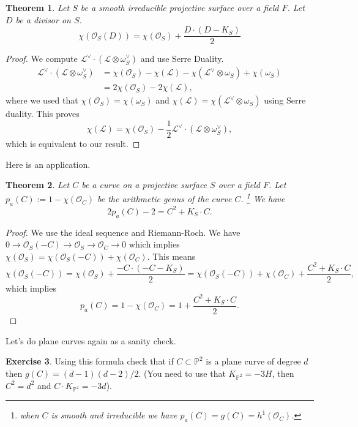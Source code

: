 \documentclass[12pt]{article}
\numberwithin{equation}{section}
\newtheorem{theorem}{Theorem}[subsection]
\theoremstyle{definition}
\newtheorem{exercise}[theorem]{Exercise}
\theoremstyle{remark}
\newcommand{\Ocal}{\mathcal{O}}
\newcommand{\PP}{\mathbb{P}}
\newcommand{\Lcal}{\mathcal{L}}
\begin{document}
\begin{theorem}
	Let $S$ be a smooth irreducible projective surface over a field $F$. 
	Let $D$ be a divisor on $S$. 
	\begin{equation}
	\chi(\Ocal_S(D)) = \chi(\Ocal_S) + \frac{D\cdot (D-K_S)}{2}
	\end{equation}
\end{theorem}
\begin{proof}
	We compute $\Lcal^{\vee} \cdot (\Lcal \otimes \omega_S^\vee)$ and use Serre Duality. 
	\begin{align*}
	\Lcal^{\vee}\cdot (\Lcal \otimes \omega_S^\vee) &= \chi(\Ocal_S) - \chi(\Lcal) -\chi(\Lcal^{\vee} \otimes\omega_S) + \chi(\omega_S) \\
	&= 2\chi(\Ocal_S) - 2\chi(\Lcal),
	\end{align*}
where we used that $\chi(\Ocal_S) = \chi(\omega_S)$ and $\chi(\Lcal) = \chi(\Lcal^{\vee}\otimes \omega_S)$ using Serre duality.
This proves 
 $$ \chi(\Lcal) = \chi(\Ocal_S) - \frac{1}{2}\Lcal^{\vee}\cdot( \Lcal \otimes \omega_S^\vee), $$
which is equivalent to our result.
\end{proof}

Here is an application. 

\begin{theorem}
	Let $C$ be a curve on a projective surface $S$ over a field $F$.
	Let $p_a(C) := 1 -\chi(\Ocal_C)$ be the arithmetic genus of the curve $C$. \footnote{when $C$ is smooth and irreducible we have $p_a(C)=g(C) = h^1(\Ocal_C)$.}
	We have 
	 $$ 2p_a(C)-2 =  C^2 + K_S \cdot C.$$
\end{theorem}
\begin{proof}
	We use the ideal sequence and Riemann-Roch. 
	We have $0\to \Ocal_S(-C) \to \Ocal_S \to \Ocal_C \to 0$ which implies $\chi(\Ocal_S) = \chi(\Ocal_S(-C)) + \chi(\Ocal_C)$. 
	This means 
$$\chi(\Ocal_S(-C)) = \chi(\Ocal_S) + \frac{-C\cdot(-C-K_S)}{2}= \chi(\Ocal_S(-C)) + \chi(\Ocal_C) + \frac{C^2+K_S\cdot C}{2}, $$
	which implies 
	$$p_a(C) = 1-\chi(\Ocal_C) = 1 + \frac{C^2+K_S\cdot C}{2}.$$
\end{proof}

Let's do plane curves again as a sanity check.
\begin{exercise}
	Using this formula check that if $C\subset \PP^2$ is a plane curve of degree $d$ then $g(C) = (d-1)(d-2)/2$. (You need to use that $K_{\PP^2} = -3H$, then $C^2=d^2$ and $C\cdot K_{\PP^2} = -3d$).
\end{exercise}
\end{document}
